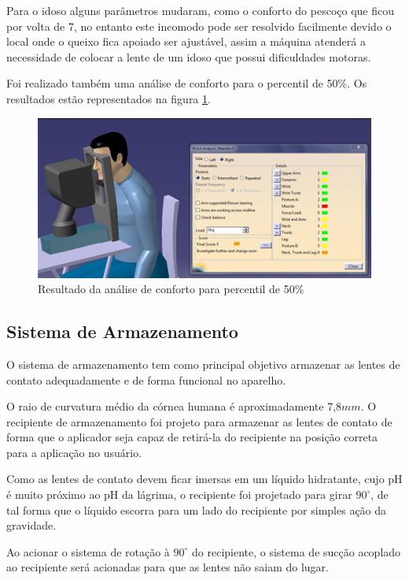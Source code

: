 Para o idoso alguns parâmetros mudaram, como o conforto do pescoço que ficou por volta de 7, no entanto este incomodo pode ser resolvido facilmente devido o local onde o queixo fica apoiado ser ajustável, assim a máquina atenderá a necessidade de colocar a lente de um idoso que possui dificuldades motoras.

Foi realizado também uma análise de conforto para o percentil de 50\%. Os resultados estão representados na figura \ref{idoso2}.


\begin{figure}[H]
		\centering
			\includegraphics[scale=1.0]{figuras/idoso2.png}
		\caption{Resultado da análise de conforto para percentil de 50\%}
		\label{idoso2}
\end{figure}





\subsection[Sistema de Armazenamento]{Sistema de Armazenamento}

O sistema de armazenamento tem como principal objetivo armazenar as lentes de contato adequadamente e de forma funcional no aparelho.

O raio de curvatura médio da córnea humana é aproximadamente 7,8$mm$. O recipiente de armazenamento foi projeto para armazenar as lentes de contato de forma que o aplicador seja capaz de retirá-la do recipiente na posição correta para a aplicação no usuário.

Como as lentes de contato devem ficar imersas em um líquido hidratante, cujo pH é muito próximo ao pH da lágrima, o recipiente foi projetado para girar $90^\circ$, de tal forma que o líquido escorra para um lado do recipiente por simples ação da gravidade.

Ao acionar o sistema de rotação à $90^\circ$ do recipiente, o sistema de sucção acoplado ao recipiente será acionadas para que as lentes não saiam do lugar.

